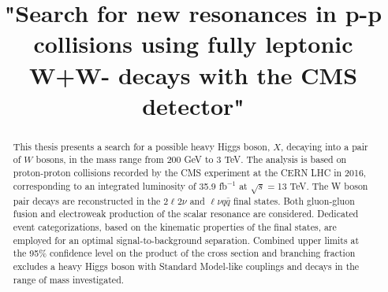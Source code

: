 \documentclass[PhD,binding=0.6cm]{../sapthesis}
\title{"Search for new resonances in p-p collisions using fully leptonic W+W- decays with the CMS detector" }
\begin{document}
\newcommand{\aMC}{\textsc{MadGraph}\xspace}
\newcommand{\qqbar}{$q \bar{q}$}
\newcommand{\POWHEG} {{\textsc{powheg}}\xspace}

\frontmatter

\maketitle

\dedication{  dedica a...}



\begin{abstract}
This thesis presents a search for a possible heavy Higgs boson, $X$, decaying into a pair of $W$
bosons, in the mass range from 200 GeV to 3 TeV. The analysis is based on proton-proton 
collisions recorded by the CMS experiment at the CERN LHC in 2016, corresponding to an integrated luminosity of 
35.9 fb$^{-1}$  at $\sqrt{s}=$13 TeV. The W boson pair decays are reconstructed in the $2\ell 2\nu$  and $\ell\nu q \bar{q}$ final states. 
Both gluon-gluon fusion and electroweak production of the scalar resonance are considered. 
Dedicated event categorizations, based on the kinematic properties of the final states, are employed for an
optimal signal-to-background separation. 
Combined upper limits at the 95\% confidence level on the product of the cross section and branching fraction excludes a heavy Higgs boson  with Standard Model-like couplings and decays in the range of mass investigated. 
\end{abstract}


\tableofcontents

\end{document}
